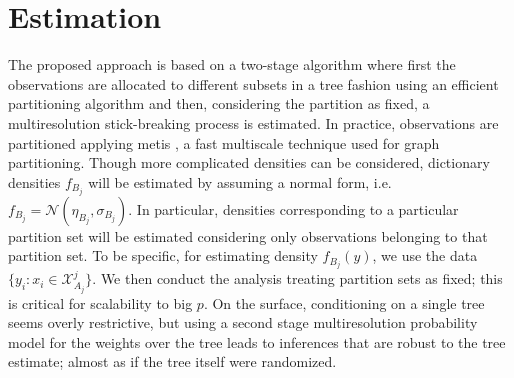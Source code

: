 \documentclass{article} %
\providecommand{\mc}[1]{\mathcal{#1}}
\begin{document}
\section{Estimation}

The proposed approach is based on a two-stage algorithm where first the observations are allocated to different subsets in a tree fashion using an efficient partitioning algorithm and then, considering the partition as fixed, a multiresolution stick-breaking process is estimated. In practice, observations are partitioned applying metis \cite{metis}, a fast multiscale technique used for graph partitioning. 
Though more complicated densities can be considered, dictionary densities $f_{B_j}$ will be estimated by assuming a normal form, i.e. $f_{B_j}=\mc{N}(\eta_{B_j},\sigma_{B_j})$. In particular, densities corresponding to a particular partition set will be estimated considering only observations belonging to that partition set. To be specific, for estimating density $f_{B_j}(y)$, we use the data $\{ y_i: x_i \in \mathcal{X}^j_{A_j} \}$. We then conduct the analysis treating partition sets as fixed; this is critical for scalability to big $p$.  On the surface, conditioning on a single tree seems overly restrictive, but using a second stage multiresolution probability model for the weights over the tree leads to inferences that are robust to the tree estimate; almost as if the tree itself were randomized.
\end{document}
